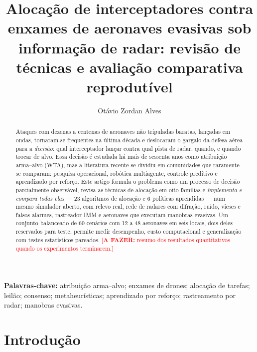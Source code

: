 \documentclass[11pt,a4paper]{article}
\title{Alocação de interceptadores contra enxames de aeronaves evasivas sob informação de radar:
revisão de técnicas e avaliação comparativa reprodutível}
\author{Otávio Zordan Alves}
\date{}
\newcommand{\todo}[1]{\textcolor{red}{[\textbf{A FAZER:} #1]}}
\begin{document}
\maketitle

\begin{abstract}
Ataques com dezenas a centenas de aeronaves não tripuladas baratas, lançadas em ondas, tornaram-se frequentes na última
década e deslocaram o gargalo da defesa aérea para a \emph{decisão}: qual interceptador lançar contra qual pista de
radar, quando, e quando trocar de alvo. Essa decisão é estudada há mais de sessenta anos como atribuição arma--alvo
(WTA), mas a literatura recente se dividiu em comunidades que raramente se comparam: pesquisa operacional, robótica
multiagente, controle preditivo e aprendizado por reforço. Este artigo formula o problema como um processo de decisão
parcialmente observável, revisa as técnicas de alocação em oito famílias e \emph{implementa e compara todas elas} --- 23
algoritmos de alocação e 6 políticas aprendidas --- num mesmo simulador aberto, com relevo real, rede de radares com
difração, ruído, vieses e falsos alarmes, rastreador IMM e aeronaves que executam manobras evasivas. Um conjunto
balanceado de 60 cenários com 12 a 48 aeronaves em seis locais, dois deles reservados para teste, permite medir
desempenho, custo computacional e generalização com testes estatísticos pareados.
\todo{resumo dos resultados quantitativos quando os experimentos terminarem.}
\end{abstract}

\noindent\textbf{Palavras-chave:} atribuição arma--alvo; enxames de drones; alocação de tarefas; leilão; consenso;
metaheurísticas; aprendizado por reforço; rastreamento por radar; manobras evasivas.

\tableofcontents
\newpage

\section{Introdução}\label{sec:intro}
\end{document}
